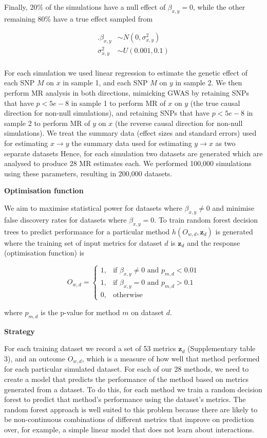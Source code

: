 \documentclass[]{article}
\begin{document}
Finally, 20\% of the simulations have a null effect of
\(\beta_{x,y} = 0\), while the other remaining 80\% have a true effect
sampled from

\[
\begin{aligned}.
\beta_{x,y} & \sim N(0, \sigma^2_{x,y}) \\
\sigma^2_{x,y} & \sim U(0.001, 0.1) \\
\end{aligned}
\]

For each simulation we used linear regression to estimate the genetic
effect of each SNP \(M\) on \(x\) in sample 1, and each SNP \(M\) on
\(y\) in sample 2. We then perform MR analysis in both directions,
mimicking GWAS by retaining SNPs that have \(p < 5e-8\) in sample 1 to
perform MR of \(x\) on \(y\) (the true causal direction for non-null
simulations), and retaining SNPs that have \(p < 5e-8\) in sample 2 to
perform MR of \(y\) on \(x\) (the reverse causal direction for non-null
simulations). We treat the summary data (effect sizes and standard
errors) used for estimating \(x \rightarrow y\) the summary data used
for estimating \(y \rightarrow x\) as two separate datasets Hence, for
each simulation two datasets are generated which are analysed to produce
28 MR estimates each. We performed 100,000 simulations using these
parameters, resulting in 200,000 datasets.

\textbf{Optimisation function}

We aim to maximise statistical power for datasets where
\(\beta_{x,y} \neq 0\) and minimise false discovery rates for datasets
where \(\beta_{x,y} = 0\). To train random forest decision trees to
predict performance for a particular method
\(h(O_{w,d}, \textbf{z}_{d})\) is generated where the training set of
input metrics for dataset \(d\) is \(\textbf{z}_{d}\) and the response
(optimisation function) is

\[
    O_{w,d} = 
\begin{cases}
    1,   & \text{if } \beta_{x,y} \neq 0 \text{ and } p_{m,d} < 0.01\\
    1,   & \text{if } \beta_{x,y} = 0 \text{ and } p_{m,d} > 0.1 \\
    0,   & \text{otherwise}
\end{cases}
\]

where \(p_{m,d}\) is the p-value for method \(m\) on dataset \(d\).

\textbf{Strategy}

For each training dataset we record a set of 53 metrics
\(\textbf{z}_{d}\) (Supplementary table 3), and an outcome \(O_{w,d}\),
which is a measure of how well that method performed for each particular
simulated dataset. For each of our 28 methods, we need to create a model
that predicts the performance of the method based on metrics generated
from a dataset. To do this, for each method we train a random decision
forest to predict that method's performance using the dataset's metrics.
The random forest approach is well suited to this problem because there
are likely to be non-continuous combinations of different metrics that
improve on prediction over, for example, a simple linear model that does
not learn about interactions.
\end{document}

